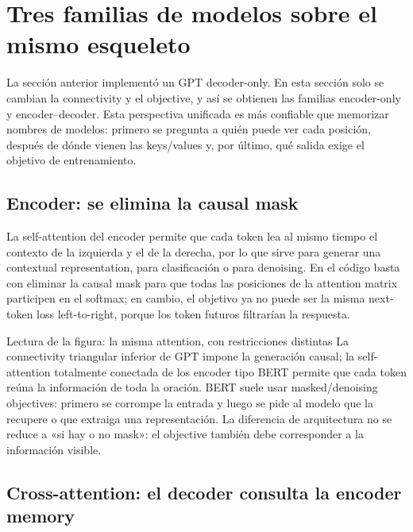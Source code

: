 \section{Tres familias de modelos sobre el mismo esqueleto}

La sección anterior implementó un GPT decoder-only. En esta sección solo se cambian la connectivity y el objective, y así se obtienen las familias encoder-only y encoder--decoder. Esta perspectiva unificada es más confiable que memorizar nombres de modelos: primero se pregunta a quién puede ver cada posición, después de dónde vienen las keys/values y, por último, qué salida exige el objetivo de entrenamiento.

\subsection{Encoder: se elimina la causal mask}

La self-attention del encoder permite que cada token lea al mismo tiempo el contexto de la izquierda y el de la derecha, por lo que sirve para generar una contextual representation, para clasificación o para denoising. En el código basta con eliminar la causal mask para que todas las posiciones de la attention matrix participen en el softmax; en cambio, el objetivo ya no puede ser la misma next-token loss left-to-right, porque los token futuros filtrarían la respuesta.


\begin{knowledgebox}{Lectura de la figura: la misma attention, con restricciones distintas}
La connectivity triangular inferior de GPT impone la generación causal; la self-attention totalmente conectada de los encoder tipo BERT permite que cada token reúna la información de toda la oración. BERT suele usar masked/denoising objectives: primero se corrompe la entrada y luego se pide al modelo que la recupere o que extraiga una representación. La diferencia de arquitectura no se reduce a «si hay o no mask»: el objective también debe corresponder a la información visible.
\end{knowledgebox}

\subsection{Cross-attention: el decoder consulta la encoder memory}

